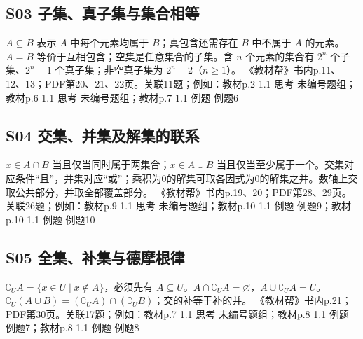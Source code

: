 \par\medskip\noindent\begin{minipage}{\linewidth}\subsection{S03 子集、真子集与集合相等}
$A\subseteq B$ 表示 $A$ 中每个元素均属于 $B$；真包含还需存在 $B$ 中不属于 $A$ 的元素。$A=B$ 等价于互相包含；空集是任意集合的子集。含 $n$ 个元素的集合有 $2^n$ 个子集、$2^n-1$ 个真子集；非空真子集为 $2^n-2$（$n\ge1$）。
{\small 《教材帮》书内p.11、12、13；PDF第20、21、22页。关联11题；例如：教材p.2 1.1 思考 未编号题组；教材p.6 1.1 思考 未编号题组；教材p.7 1.1 例题 例题6}\par\end{minipage}\par
\par\medskip\noindent\begin{minipage}{\linewidth}\subsection{S04 交集、并集及解集的联系}
$x\in A\cap B$ 当且仅当同时属于两集合；$x\in A\cup B$ 当且仅当至少属于一个。交集对应条件“且”，并集对应“或”；乘积为0的解集可取各因式为0的解集之并。数轴上交取公共部分，并取全部覆盖部分。
{\small 《教材帮》书内p.19、20；PDF第28、29页。关联26题；例如：教材p.9 1.1 思考 未编号题组；教材p.10 1.1 例题 例题9；教材p.10 1.1 例题 例题10}\par\end{minipage}\par
\par\medskip\noindent\begin{minipage}{\linewidth}\subsection{S05 全集、补集与德摩根律}
$\complement_U A=\{x\in U\mid x\notin A\}$，必须先有 $A\subseteq U$。$A\cap\complement_U A=\varnothing$，$A\cup\complement_U A=U$。$\complement_U(A\cup B)=(\complement_U A)\cap(\complement_U B)$；交的补等于补的并。
{\small 《教材帮》书内p.21；PDF第30页。关联17题；例如：教材p.7 1.1 思考 未编号题组；教材p.8 1.1 例题 例题7；教材p.8 1.1 例题 例题8}\par\end{minipage}\par
